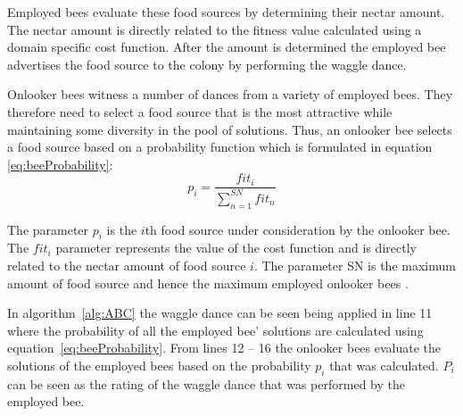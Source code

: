 Employed bees evaluate these food sources by determining their nectar amount\cite{ABCCompareStudy,ABCLeafConstrained}. The nectar amount is directly related to the fitness value calculated using a domain specific cost function\cite{ABCCompareStudy,ABCReconfigDistro}. After the amount is determined the employed bee advertises the food source to the colony by performing the waggle dance.

Onlooker bees witness a number of dances from a variety of employed bees\cite{ABCFusionGrid,BeeJobShop}. They therefore need to select a food source that is the most attractive while maintaining some diversity in the pool of solutions. Thus, an onlooker bee selects a food source based on a probability function which is formulated in equation \ref{eq:beeProbability}\cite{ABCCompareStudy}:
\begin{equation}
\label{eq:beeProbability}
p_i = \frac{{fit}_i}{\sum^{SN}_{n=1}{fit}_n}
\end{equation}

The parameter $p_i$ is the $i$th food source under consideration by the onlooker bee. The ${fit}_i$ parameter represents the value of the cost function and is directly related to the nectar amount of food source $i$. The parameter SN is the maximum amount of food source and hence the maximum employed onlooker bees \cite{ABCCompareStudy}.

In algorithm~\ref{alg:ABC} the waggle dance can be seen being applied in line 11 where the probability of all the employed bee' solutions are calculated using equation~\ref{eq:beeProbability}. From lines 12 -- 16 the onlooker bees evaluate the solutions of the employed bees based on the probability $p_i$ that was calculated. $P_i$ can be seen as the rating of the waggle dance that was performed by the employed bee.

